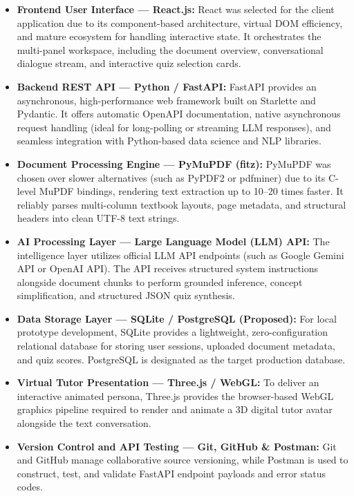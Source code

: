 \documentclass[11pt,a4paper]{report}
\begin{document}
\begin{itemize}[topsep=2pt, itemsep=6pt]
    \item \textbf{Frontend User Interface --- React.js:}
    React was selected for the client application due to its component-based architecture, virtual DOM efficiency, and mature ecosystem for handling interactive state. It orchestrates the multi-panel workspace, including the document overview, conversational dialogue stream, and interactive quiz selection cards.
    
    \item \textbf{Backend REST API --- Python / FastAPI:}
    FastAPI provides an asynchronous, high-performance web framework built on Starlette and Pydantic. It offers automatic OpenAPI documentation, native asynchronous request handling (ideal for long-polling or streaming LLM responses), and seamless integration with Python-based data science and NLP libraries.
    
    \item \textbf{Document Processing Engine --- PyMuPDF (fitz):}
    PyMuPDF was chosen over slower alternatives (such as PyPDF2 or pdfminer) due to its C-level MuPDF bindings, rendering text extraction up to 10--20 times faster. It reliably parses multi-column textbook layouts, page metadata, and structural headers into clean UTF-8 text strings.
    
    \item \textbf{AI Processing Layer --- Large Language Model (LLM) API:}
    The intelligence layer utilizes official LLM API endpoints (such as Google Gemini API or OpenAI API). The API receives structured system instructions alongside document chunks to perform grounded inference, concept simplification, and structured JSON quiz synthesis.
    
    \item \textbf{Data Storage Layer --- SQLite / PostgreSQL (Proposed):}
    For local prototype development, SQLite provides a lightweight, zero-configuration relational database for storing user sessions, uploaded document metadata, and quiz scores. PostgreSQL is designated as the target production database.
    
    \item \textbf{Virtual Tutor Presentation --- Three.js / WebGL:}
    To deliver an interactive animated persona, Three.js provides the browser-based WebGL graphics pipeline required to render and animate a 3D digital tutor avatar alongside the text conversation.
    
    \item \textbf{Version Control and API Testing --- Git, GitHub \& Postman:}
    Git and GitHub manage collaborative source versioning, while Postman is used to construct, test, and validate FastAPI endpoint payloads and error status codes.
\end{itemize}
\clearpage
\end{document}
